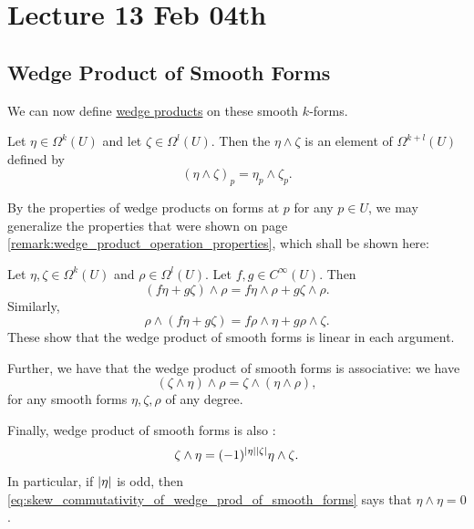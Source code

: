 \documentclass[notoc,notitlepage]{tufte-book}
\begin{document}


\chapter{Lecture 13 Feb 04th}%
\label{chp:lecture_13_feb_04th}

\section{Wedge Product of Smooth Forms}%
\label{sec:wedge_product_of_smooth_forms}

We can now define \hyperref[sec:wedge_product_of_forms]{wedge products} on these smooth $k$-forms.

\begin{defn}\label{defn:wedge_product_of_k_forms}
  Let $\eta \in \Omega^k(U)$ and let $\zeta \in \Omega^l(U)$. Then the 
  $\eta \land \zeta$ is an element of $\Omega^{k + l}(U)$ defined by
  \begin{equation*}
    (\eta \land \zeta)_p = \eta_p \land \zeta_p.
  \end{equation*}
\end{defn}

By the properties of wedge products on forms at $p$ for any $p \in U$, we may generalize the
properties that were shown on page \cref{remark:wedge_product_operation_properties}, which
shall be shown here:

\begin{note}\label{note:wedge_product_operation_properties_generalized}
  Let $\eta, \zeta \in \Omega^k(U)$ and $\rho \in \Omega^l(U)$. Let $f, g \in C^\infty(U)$. Then
  \begin{equation*}
    (f \eta + g \zeta) \land \rho = f \eta \land \rho + g \zeta \land \rho.
  \end{equation*}
  Similarly,
  \begin{equation*}
    \rho \land (f \eta + g \zeta) = f \rho \land \eta + g \rho \land \zeta.
  \end{equation*}
  These show that the wedge product of smooth forms is linear in each argument.

  Further, we have that the wedge product of smooth forms is associative: we have
  \begin{equation*}
    (\zeta \land \eta) \land \rho = \zeta \land (\eta \land \rho),
  \end{equation*}
  for any smooth forms $\eta, \zeta, \rho$ of any degree.

  Finally, wedge product of smooth forms is also :
  \begin{equation}\label{eq:skew_commutativity_of_wedge_prod_of_smooth_forms}
    \zeta \land \eta = (-1)^{\left|\eta\right|\left|\zeta\right|} \eta \land \zeta.
  \end{equation}
  In particular, if $\left|\eta\right|$ is odd, then 
  \cref{eq:skew_commutativity_of_wedge_prod_of_smooth_forms} says that $\eta \land \eta = 0$.
\end{note}
\end{document}
